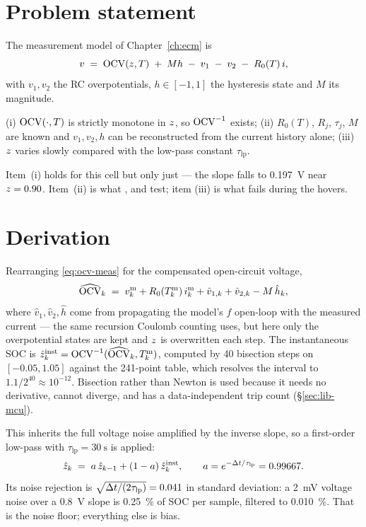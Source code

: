 \section{Problem statement}
The measurement model of Chapter~\ref{ch:ecm} is
\begin{equation}
v \;=\; \mathrm{OCV}(z,T) \;+\; M h \;-\; v_1 \;-\; v_2 \;-\; R_0(T)\,i ,
\label{eq:ocv-meas}
\end{equation}
with $v_1,v_2$ the RC overpotentials, $h\in[-1,1]$ the hysteresis state and $M$ its magnitude.
\begin{assumption}\label{as:ocv-all}
(i) $\mathrm{OCV}(\cdot,T)$ is strictly monotone in $z$, so $\mathrm{OCV}^{-1}$ exists; (ii) $R_0(T)$, $R_j$,
$\tau_j$, $M$ are known and $v_1,v_2,h$ can be reconstructed from the current history alone;
(iii) $z$ varies slowly compared with the low-pass constant $\tau_{\text{lp}}$.
\end{assumption}
Item~(i) holds for this cell but only just --- the slope falls to \SI{0.197}{\volt} near
$z=0.90$. Item~(ii) is what ,  and  test; item
(iii) is what fails during the hovers.

\section{Derivation}
Rearranging \eqref{eq:ocv-meas} for the compensated open-circuit voltage,
\begin{equation}
\widehat{\mathrm{OCV}}_k \;=\; v^{\text{m}}_k + R_0(T^{\text{m}}_k)\, i^{\text{m}}_k
 + \hat v_{1,k} + \hat v_{2,k} - M\,\hat h_k ,
\label{eq:ocv-compensate}
\end{equation}
where $\hat v_1,\hat v_2,\hat h$ come from propagating the model's $f$ open-loop with the measured
current --- the same recursion Coulomb counting uses, but here only the overpotential states are
kept and $z$ is overwritten each step. The instantaneous SOC is
$\hat{z}^{\text{inst}}_k = \mathrm{OCV}^{-1}(\widehat{\mathrm{OCV}}_k, T^{\text{m}}_k)$, computed by 40 bisection
steps on $[-0.05,1.05]$ against the 241-point table, which resolves the interval to
$1.1/2^{40}\approx10^{-12}$. Bisection rather than Newton is used because it needs no derivative,
cannot diverge, and has a data-independent trip count (\S\ref{sec:lib-mcu}).

This inherits the full voltage noise amplified by the inverse slope, so a first-order low-pass with
$\tau_{\text{lp}} = \SI{30}{\second}$ is applied:
\begin{equation}
\hat{z}_k \;=\; a\,\hat{z}_{k-1} + (1-a)\,\hat{z}^{\text{inst}}_k,
\qquad a = e^{-\Delta t/\tau_{\text{lp}}} = 0.99667 .
\label{eq:ocv-lowpass}
\end{equation}
Its noise rejection is $\sqrt{\Delta t/(2\tau_{\text{lp}})} = 0.041$ in standard deviation: a
\SI{2}{\milli\volt} voltage noise over a \SI{0.8}{\volt} slope is \SI{0.25}{\percent} of SOC per
sample, filtered to \SI{0.010}{\percent}. That is the noise floor; everything else is bias.

